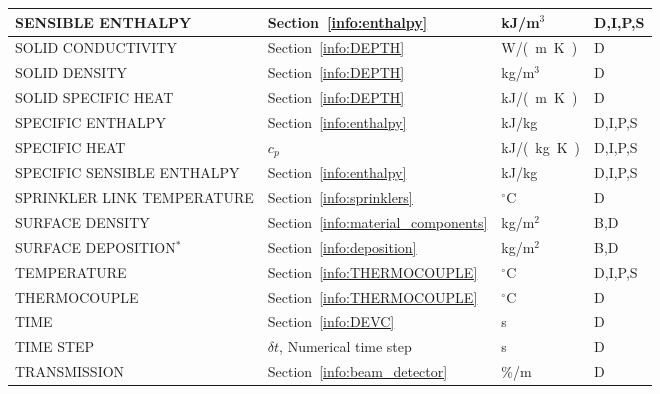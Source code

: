\documentclass[11pt]{book}
\begin{document}
\begin{longtable}{@{\extracolsep{\fill}}|l|l|l|l|}
{\ct SENSIBLE ENTHALPY}                         & Section~\ref{info:enthalpy}                   & kJ/m$^3$       & D,I,P,S      \\ \hline
{\ct SOLID CONDUCTIVITY}                        & Section~\ref{info:DEPTH}                      & \si{W/(m.K)}   & D            \\ \hline
{\ct SOLID DENSITY}                             & Section~\ref{info:DEPTH}                      & kg/m$^3$       & D            \\ \hline
{\ct SOLID SPECIFIC HEAT}                       & Section~\ref{info:DEPTH}                      & \si{kJ/(m.K)}  & D            \\ \hline
{\ct SPECIFIC ENTHALPY}                         & Section~\ref{info:enthalpy}                   & kJ/kg          & D,I,P,S      \\ \hline
{\ct SPECIFIC HEAT}                             & $c_p$                                         & \si{kJ/(kg.K)} & D,I,P,S      \\ \hline
{\ct SPECIFIC SENSIBLE ENTHALPY}                & Section~\ref{info:enthalpy}                   & kJ/kg          & D,I,P,S      \\ \hline
{\ct SPRINKLER LINK TEMPERATURE}                & Section~\ref{info:sprinklers}                 & $^\circ$C      & D            \\ \hline
{\ct SURFACE DENSITY}                           & Section~\ref{info:material_components}        & kg/m$^2$       & B,D          \\ \hline
{\ct SURFACE DEPOSITION}$^*$                    & Section~\ref{info:deposition}                 & kg/m$^2$       & B,D          \\ \hline
{\ct TEMPERATURE}                               & Section~\ref{info:THERMOCOUPLE}               & $^\circ$C      & D,I,P,S      \\ \hline
{\ct THERMOCOUPLE}                              & Section~\ref{info:THERMOCOUPLE}               & $^\circ$C      & D            \\ \hline
{\ct TIME}                                      & Section~\ref{info:DEVC}                       & s              & D            \\ \hline
{\ct TIME STEP}                                 & $\delta t$, Numerical time step               & s              & D            \\ \hline
{\ct TRANSMISSION}                              & Section~\ref{info:beam_detector}              & \%/m           & D            \\ \hline

\end{longtable}
\end{document}
